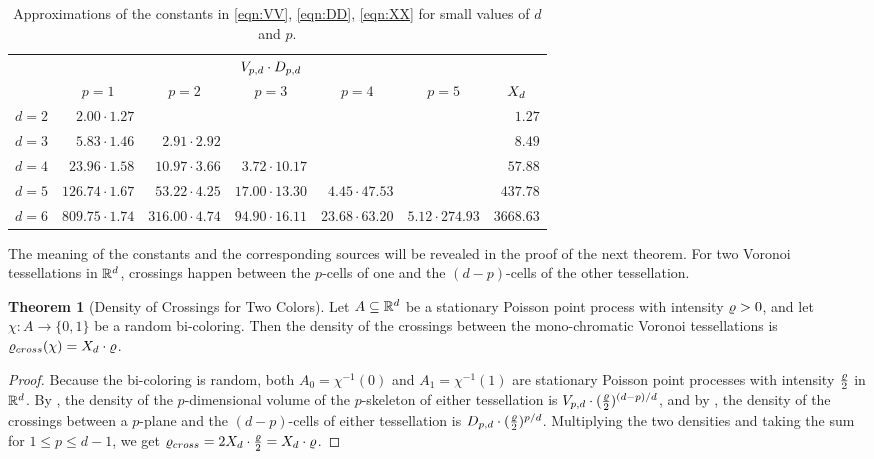 \documentclass[a4paper]{article}
\newcommand {\mm}[1]   {\ifmmode{#1}\else{\mbox{\(#1\)}}\fi}
\newcommand{\Rspace}        {\mm{{\mathbb R}}}
\newcommand{\Crossings}     {\mm{\varrho_{\rm cross}}}
\newcommand{\intensity}     {\mm{\varrho}}
\newcommand{\VV}[2]         {\mm{V_{#1,#2}}}
\newcommand{\DD}[2]         {\mm{D_{#1,#2}}}
\newcommand{\XX}[1]         {\mm{X_{#1}}}
\theoremstyle{definition}
\newtheorem{theorem}{Theorem}
\numberwithin{theorem}{section}
\numberwithin{equation}{section}
\begin{document}
\begin{table}[hbt]
    \centering
    \begin{tabular}{r||rrrrr|r}
      & \multicolumn{5}{c|}{$\VV{p}{d} \cdot \DD{p}{d}$} & \\
      & \multicolumn{1}{c}{$p=1$} & \multicolumn{1}{c}{$p=2$} & \multicolumn{1}{c}{$p=3$} & \multicolumn{1}{c}{$p=4$} & \multicolumn{1}{c|}{$p=5$} & \multicolumn{1}{c}{$\XX{d}$} \\
      \hline \hline
      $d=2$ & $2.00 \cdot 1.27$ &                   &                   &                   &                    & $1.27$ \\
      $d=3$ & $5.83 \cdot 1.46$ & $2.91 \cdot 2.92$ &                   &                   &                    & $8.49$ \\
      $d=4$ & $23.96 \cdot 1.58$ & $10.97 \cdot 3.66$ & $3.72 \cdot 10.17$ &                   &                    & $57.88$ \\
      $d=5$ & $126.74 \cdot 1.67$ & $53.22 \cdot 4.25$ & $17.00 \cdot 13.30$ & $4.45 \cdot 47.53$ &                    & $437.78$ \\
      $d=6$ & $809.75 \cdot 1.74$ & $316.00 \cdot 4.74$ & $94.90 \cdot 16.11$ & $23.68 \cdot 63.20$ & $5.12 \cdot 274.93$  & $3668.63$
    \end{tabular}
    \caption{Approximations of the constants in \eqref{eqn:VV}, \eqref{eqn:DD}, \eqref{eqn:XX} for small values of $d$ and $p$.}
    \label{tbl:crossingconstants}
\end{table}
The meaning of the constants and the corresponding sources will be revealed in the proof of the next theorem.
For two Voronoi tessellations in $\Rspace^d$, crossings happen between the $p$-cells of one and the $(d-p)$-cells of the other tessellation.
\begin{theorem}[Density of Crossings for Two Colors]
  \label{thm:density_of_crossings_for_two_colors}
  Let $A \subseteq \Rspace^d$ be a stationary Poisson point process with intensity $\intensity > 0$, and let $\chi \colon A \to \{0,1\}$ be a random bi-coloring.
  Then the density of the crossings between the mono-chromatic Voronoi tessellations is $\Crossings (\chi) = \XX{d} \cdot \intensity$.
\end{theorem}
\begin{proof}
  Because the bi-coloring is random, both $A_0 = \chi^{-1}(0)$ and $A_1 = \chi^{-1}(1)$ are stationary Poisson point processes with intensity $\frac{\intensity}{2}$ in $\Rspace^d$.
  By \cite[Theorem 1.1]{EdNi19B}, the density of the $p$-dimensional volume of the $p$-skeleton of either tessellation is $\VV{p}{d} \cdot (\frac{\intensity}{2})^{{(d-p)}/{d}}$, and by \cite{EdNi19A}, the density of the crossings between a $p$-plane and the $(d-p)$-cells of either tessellation is $\DD{p}{d} \cdot (\frac{\intensity}{2})^{p/d}$.
  Multiplying the two densities and taking the sum for $1 \leq p \leq d-1$, we get $\Crossings = 2 \XX{d} \cdot \frac{\intensity}{2} = \XX{d} \cdot \intensity$.
\end{proof}
\end{document}
